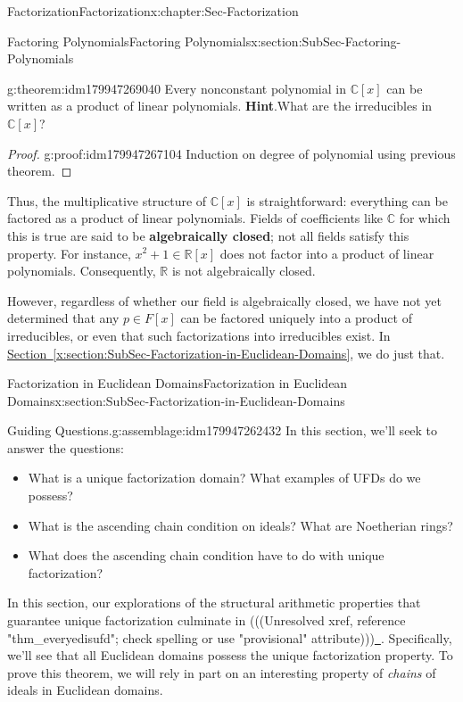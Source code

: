 \documentclass[oneside,10pt,]{book}
\newcommand{\blocktitlefont}{\relax}
\newcommand{\xreffont}{\relax}
\newcommand{\terminology}[1]{\textbf{#1}}
\numberwithin{equation}{section}
\def\C{{\mathbb C}}
\def\R{{\mathbb R}}
\begin{document}
\begin{chapterptx}{Factorization}{}{Factorization}{}{}{x:chapter:Sec-Factorization}
\begin{sectionptx}{Factoring Polynomials}{}{Factoring Polynomials}{}{}{x:section:SubSec-Factoring-Polynomials}
\begin{theorem}{}{}{g:theorem:idm179947269040}
Every nonconstant polynomial in \(\C[x]\) can be written as a product of linear polynomials.%
\textbf{\blocktitlefont Hint}.\quad{}What are the irreducibles in \(\C[x]\)?%
\end{theorem}
\begin{proof}{}{g:proof:idm179947267104}
Induction on degree of polynomial using previous theorem.%
\end{proof}
Thus, the multiplicative structure of \(\C[x]\) is straightforward: everything can be factored as a product of linear polynomials. Fields of coefficients like \(\C\) for which this is true are said to be \terminology{algebraically closed}; not all fields satisfy this property. For instance, \(x^2 + 1\in \R[x]\) does not factor into a product of linear polynomials. Consequently, \(\R\) is not algebraically closed.%
\par
However, regardless of whether our field is algebraically closed, we have not yet determined that any \(p\in F[x]\) can be factored uniquely into a product of irreducibles, or even that such factorizations into irreducibles exist. In \hyperref[x:section:SubSec-Factorization-in-Euclidean-Domains]{Section~{\xreffont\ref{x:section:SubSec-Factorization-in-Euclidean-Domains}}}, we do just that.%
\end{sectionptx}
%
%
\typeout{************************************************}
\typeout{************************************************}
%
\begin{sectionptx}{Factorization in Euclidean Domains}{}{Factorization in Euclidean Domains}{}{}{x:section:SubSec-Factorization-in-Euclidean-Domains}
\begin{assemblage}{Guiding Questions.}{g:assemblage:idm179947262432}%
In this section, we'll seek to answer the questions: %
\begin{itemize}[label=\textbullet]
\item{}What is a unique factorization domain? What examples of UFDs do we possess?%
\item{}What is the ascending chain condition on ideals? What are Noetherian rings?%
\item{}What does the ascending chain condition have to do with unique factorization?%
\end{itemize}
%
\end{assemblage}
\begin{introduction}{}%
In this section, our explorations of the structural arithmetic properties that guarantee unique factorization culminate in {(((Unresolved xref, reference "thm\_everyedisufd"; check spelling or use "provisional" attribute)))}\hyperlink{}{~}. Specifically, we'll see that all Euclidean domains possess the unique factorization property. To prove this theorem, we will rely in part on an interesting property of \emph{chains} of ideals in Euclidean domains.%

\end{introduction}
\end{sectionptx}
\end{chapterptx}
\end{document}
